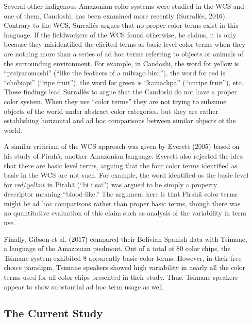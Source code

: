 \documentclass[
  english,
  ,apa7,floatsintext]{apa6}
\begin{document}
Several other indigenous Amazonian color systems were studied in the WCS and one of them, Candoshi, has been examined more recently (Surrallés, 2016). Contrary to the WCS, Surrallés argues that no proper color terms exist in this language. If the fieldworkers of the WCS found otherwise, he claims, it is only because they misidentified the elicited terms as basic level color terms when they are nothing more than a series of ad hoc terms referring to objects or animals of the surrounding environment. For example, in Candoshi, the word for yellow is ``ptsiyaromashi'' (``like the feathers of a milvago bird''), the word for red is ``chobiapi'' (``ripe fruit''), the word for green is ``kamachpa'' (``unripe fruit''), etc. These findings lead Surrallés to argue that the Candoshi do not have a proper color system. When they use ``color terms'' they are not trying to subsume objects of the world under abstract color categories, but they are rather establishing horizontal and ad hoc comparisons between similar objects of the world.

A similar criticism of the WCS approach was given by Everett (2005) based on his study of Pirahã, another Amazonian language. Everett also rejected the idea that there are basic level terms, arguing that the four color terms identified as basic in the WCS are not such. For example, the word identified as the basic level for \emph{red}/\emph{yellow} in Pirahã (``bi i sai'') was argued to be simply a property descriptor meaning ``blood-like.'' The argument here is that Pirahã color terms might be ad hoc comparisons rather than proper basic terms, though there was no quantitative evaluation of this claim such as analysis of the variability in term use.

Finally, Gibson et al. (2017) compared their Bolivian Spanish data with Tsimane, a language of the Amazonian piedmont. Out of a total of 80 color chips, the Tsimane system exhibited 8 apparently basic color terms. However, in their free-choice paradigm, Tsimane speakers showed high variability in nearly all the color terms used for all color chips presented in their study. Thus, Tsimane speakers appear to show substantial ad hoc term usage as well.

\hypertarget{the-current-study}{%
\subsection{The Current Study}\label{the-current-study}}
\end{document}
